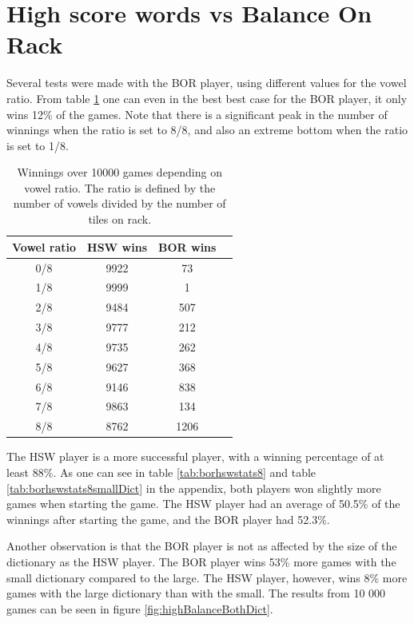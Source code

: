\documentclass[a4paper, 12pt]{report}
\begin{document}
\section{High score words vs Balance On Rack}
\label{sec:highBalance}

Several tests were made with the BOR player, using different values for the vowel ratio. From table \ref{tab:bor+hsw} one can even in the best best case for the BOR player, it only wins 12\% of the games. Note that there is a significant peak in the number of winnings when the ratio is set to 8/8, and also an extreme bottom when the ratio is set to 1/8.


\begin{table}[h]
\centering
    \begin{tabular}{ c | c | c p{5cm}}
   	Vowel ratio & HSW wins & BOR wins \\ \hline
	0/8 & 9922 & 73 \\ 
    	1/8 & 9999  & 1 \\ 
    	2/8 & 9484 & 507 \\
    	3/8 & 9777 & 212 \\
	4/8 & 9735 & 262 \\ 
	5/8 & 9627 & 368 \\ 
	6/8 & 9146 & 838 \\ 
	7/8 & 9863 & 134 \\ 
	8/8 & 8762 & 1206 \\
    \end{tabular}
\caption{Winnings over 10000 games depending on vowel ratio. The ratio is defined by the number of vowels divided by the number of tiles on rack.}
\label{tab:bor+hsw}
\end{table}


The HSW player is a more successful player, with a winning percentage of at least 88\%. As one can see in table \ref{tab:borhswstats8} and table \ref{tab:borhswstats8smallDict} in the appendix, both players won slightly more games when starting the game. The HSW player had an average of 50.5\% of the winnings after starting the game, and the BOR player had 52.3\%. 


Another observation is that the BOR player is not as affected by the size of the dictionary as the HSW player. The BOR player wins 53\% more games with the small dictionary compared to the large. The HSW player, however, wins 8\% more games with the large dictionary than with the small. The results from 10 000 games can be seen in figure \ref{fig:highBalanceBothDict}.
\end{document}
